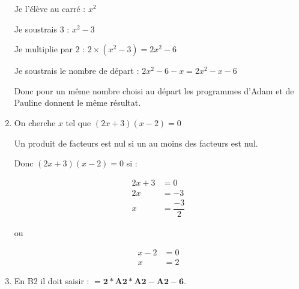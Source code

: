 \begin{enumerate}
	Je l’élève au carré : $x^2$
	
	Je soustrais $3$ : $x^2-3$
	
	Je multiplie par $2$ : $2\times (x^2-3) = 2x^2-6$
	
	Je soustrais le nombre de départ : $2x^2-6-x= 2x^2-x-6$
	
Donc pour un même nombre choisi au départ les programmes d’Adam et de Pauline donnent le même résultat.

\item On cherche $x$ tel que $(2x+3)(x-2)=0$

Un produit de facteurs est nul si un au moins des facteurs est nul.

Donc $(2x+3)(x-2)=0$ si :
\begin{minipage}{4cm}
\begin{align*}
2x+3 &= 0\\
2x &=-3\\
x &= \dfrac{-3}{2}
\end{align*}
\end{minipage}
\begin{minipage}{1cm}
ou
\end{minipage}
\begin{minipage}{4cm}
\begin{align*}
x-2 &=0\\
x &= 2
\end{align*}
\end{minipage}


\item En B2 il doit saisir : $\mathbf{= 2*A2*A2 - A2 - 6}$.
\end{enumerate}